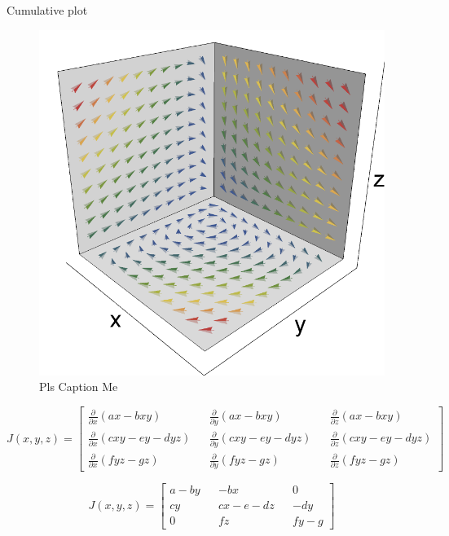 \documentclass[11pt,oneside]{article}
\begin{document}
	Cumulative plot
	\begin{figure}[H]
		\center
		\includegraphics[scale=0.80]{XYZ}
		\caption{Pls Caption Me}
	\end{figure}
	
	
	\begin{equation}
	J(x,y,z) = 
	\begin{bmatrix}
	\frac{\partial}{\partial x}(ax - bxy) && \frac{\partial}{\partial y}(ax - bxy) && \frac{\partial}{\partial z}(ax - bxy) \\
	\frac{\partial}{\partial x}(cxy - ey - dyz) && \frac{\partial}{\partial y}(cxy - ey - dyz) && \frac{\partial}{\partial z}(cxy - ey - dyz) \\
	\frac{\partial}{\partial x}(fyz - gz) && \frac{\partial}{\partial y}(fyz - gz) && \frac{\partial}{\partial z}(fyz - gz)
	\end{bmatrix}
	\end{equation}
	
	\begin{equation}
	J(x,y,z) = 
	\begin{bmatrix}
	a - by && - bx && 0 \\
	cy && cx - e - dz && -dy \\
	0 && fz && fy - g
	\end{bmatrix}
	\end{equation}
	
\end{document}
